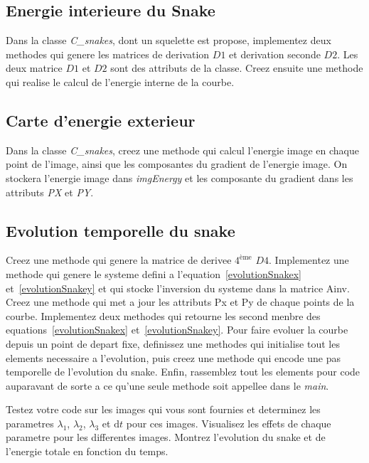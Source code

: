 \documentclass[10pt,a4paper]{article}
\begin{document}
\subsection{Energie interieure du Snake}
Dans la classe \textit{C\_snakes}, dont un squelette est propose, implementez deux methodes qui genere les matrices de derivation $D1$ et derivation seconde $D2$. Les deux matrice $D1$ et $D2$ sont des attributs de la classe. Creez ensuite une methode qui realise le calcul de l'energie interne de la courbe.

\subsection{Carte d'energie exterieur}
Dans la classe \textit{C\_snakes}, creez une methode qui calcul l'energie image en chaque point de l'image, ainsi que les composantes du gradient de l'energie image. On stockera l'energie image dans \textit{imgEnergy} et les composante du gradient dans les attributs \textit{PX} et \textit{PY}.


\subsection{Evolution temporelle du snake}
Creez une methode qui genere la matrice de derivee $4^{\text{\`eme}}$ $D4$. Implementez une methode qui genere le systeme defini a l'equation~\eqref{evolutionSnakex} et~\eqref{evolutionSnakey}  et qui stocke l'inversion du systeme dans la matrice Ainv. Creez une methode qui met a jour les attributs Px et Py de chaque points de la courbe. Implementez deux methodes qui retourne les second menbre des equations~\eqref{evolutionSnakex} et~\eqref{evolutionSnakey}. Pour faire evoluer la courbe depuis un point de depart fixe, definissez une methodes qui initialise tout les elements necessaire a l'evolution, puis creez une methode qui encode une pas temporelle de l'evolution du snake. Enfin, rassemblez tout les elements pour code auparavant de sorte a ce qu'une seule methode soit appellee dans le \textit{main}. 

Testez votre code sur les images qui vous sont fournies et determinez les parametres $\lambda_1$, $\lambda_2$, $\lambda_3$ et $\mathrm{d}t$ pour ces images. Visualisez les effets de chaque parametre pour les differentes images. Montrez l'evolution du snake et de l'energie totale en fonction du temps.
\end{document}
